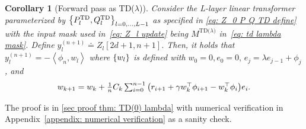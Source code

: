 \documentclass{article}
\newcommand{\indot}[2]{{\left<#1, #2\right>}}
\newcommand{\td}{\text{TD}}
\newcommand{\tdlambda}{\text{TD($\lambda$)}}
\newtheorem{corollary}{Corollary}
\begin{document}
\begin{corollary}[Forward pass as TD($\lambda$)]
\label{thm: TD(0) lambda}
    Consider the L-layer linear transformer parameterized by $\qty{P_l^{\td}, Q_l^{\td}}_{l=0,\dots, L-1}$ as specified in \eqref{eq: Z_0 P Q TD define}
    with the input mask used in~\eqref{eq: Z_l update} being
    $M^\tdlambda$ in~\eqref{eq: td lambda mask}.
    Define $y_l^{(n+1)} \doteq Z_l[2d+1, n+1]$.
    Then, it holds that $y_l^{(n+1)} =  - \indot{\phi_n}{w_l}$ where $\qty{w_l}$ is defined with $w_0 = 0, e_0 = 0, \, e_j = \lambda e_{j-1} + \phi_j$, and
    \begin{align}
    \textstyle w_{k+1} = w_k + \frac{1}{n}C_k\sum_{i=0}^{n-1} \qty(r_{i+1} + \gamma w_k^\top \phi_{i+1} - w_k^\top \phi_i )e_i. 
    \end{align}
\end{corollary}
The proof is in \ref{sec proof thm: TD(0) lambda} with numerical verification in Appendix~\ref{appendix: numerical verification} as a sanity check.
\end{document}
